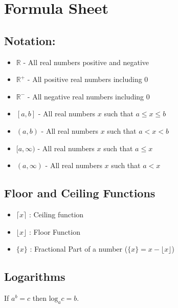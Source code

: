 
\pagestyle{fancy}
\setmarginsrb{20mm}{0mm}{20mm}{25mm}{12mm}{11mm}{0mm}{11mm}

\section*{Formula Sheet}
\subsection*{Notation:}
\begin{framed}
	\begin{multicols}{2}
		\begin{itemize}
			\item $\mathbb{R}$ - All real numbers positive and negative
			\item $\mathbb{R}^+$ - All positive real numbers including $0$
			\item $\mathbb{R}^-$ - All negative real numbers including $0$
			\\
			\bigskip 
			\item $[a,b]$ - All real numbers $x$ such that $a \le x \le b$
			\item $(a,b)$ - All real numbers $x$ such that $a < x < b$
			\item $[a,\infty)$ - All real numbers $x$ such that $a \le x$
			\item $(a,\infty)$ - All real numbers $x$ such that $a < x$
		\end{itemize} 
	\end{multicols}
\end{framed}
	
\subsection*{Floor and Ceiling Functions}
	\begin{itemize}
		\item $\lceil x\rceil$ : Ceiling function
		\item $\lfloor x\rfloor$  : Floor Function
		\item $\{x\}$ : Fractional Part of a number
		($\{x\} = x- \lfloor x\rfloor$)
	\end{itemize}
	\subsection*{Logarithms}
	\begin{framed}
	If $a^b = c$ then $\mbox{log}_a c = b$.
	\end{framed}
	

